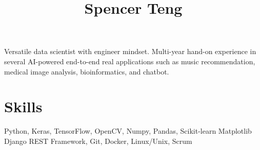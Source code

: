 \documentclass[11pt]{article} %
\begin{document}
{\selectfont



\hspace{-1.2em}\title{ Spencer Teng } 

\noindent\begin{minipage}[t]{0.9\textwidth}
\vspace{0.5em}

Versatile data scientist with engineer mindset. Multi-year hand-on experience in several AI-powered end-to-end real applications such as music recommendation, medical image analysis, bioinformatics, and chatbot.



\section{Skills}
%

Python, Keras, TensorFlow, OpenCV, Numpy, Pandas, Scikit-learn Matplotlib \\
Django REST Framework, Git, Docker, Linux/Unix, Scrum \\


\end{minipage}}
\end{document}
